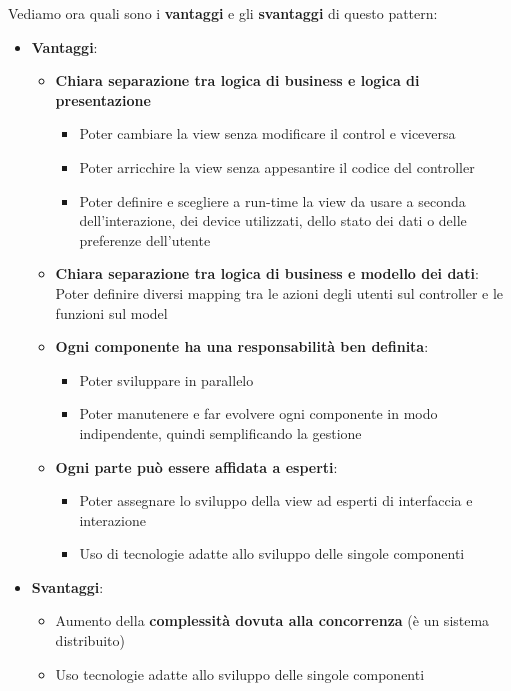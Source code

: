 \documentclass[12pt]{article}
\begin{document}
Vediamo ora quali sono i \textbf{vantaggi} e gli \textbf{svantaggi} di questo pattern:
\begin{itemize}
    \item \textbf{Vantaggi}:
    \begin{itemize}
        \item \textbf{Chiara separazione tra logica di business e logica di presentazione}
        \begin{itemize}
            \item Poter cambiare la view senza modificare il control e viceversa
            \item Poter arricchire la view senza appesantire il codice del controller
            \item Poter definire e scegliere a run-time la view da usare a seconda dell'interazione, dei device utilizzati, dello stato dei dati o delle preferenze dell'utente
        \end{itemize}
        \item \textbf{Chiara separazione tra logica di business e modello dei dati}: Poter definire diversi mapping tra le azioni degli utenti sul controller e le funzioni sul model
        \item \textbf{Ogni componente ha una responsabilità ben definita}:
        \begin{itemize}
            \item Poter sviluppare in parallelo
            \item Poter manutenere e far evolvere ogni componente in modo indipendente, quindi semplificando la gestione
        \end{itemize}
        \item \textbf{Ogni parte può essere affidata a esperti}:
        \begin{itemize}
            \item Poter assegnare lo sviluppo della view ad esperti di interfaccia e interazione
            \item Uso di tecnologie adatte allo sviluppo delle singole componenti
        \end{itemize}
    \end{itemize}
    \item \textbf{Svantaggi}:
    \begin{itemize}
        \item Aumento della \textbf{complessità dovuta alla concorrenza} (è un sistema distribuito)
        \item Uso tecnologie adatte allo sviluppo delle singole componenti
    \end{itemize}
\end{itemize}
\end{document}
